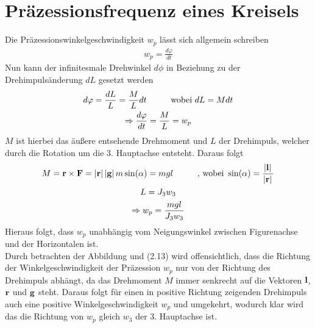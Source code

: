 

\section{Präzessionsfrequenz eines Kreisels}
Die Präzessionswinkelgeschwindigkeit $w_p$ lässt sich allgemein schreiben 
\begin{align}
    w_p = \frac{d\varphi}{dt}
\end{align}
Nun kann der infinitesmale Drehwinkel $d\phi$ in Beziehung zu der Drehimpulsänderung $dL$ gesetzt werden
\begin{gather}
    d\varphi = \frac{dL}{L} = \frac{M}{L} dt \hspace*{1cm}\text{wobei } dL = M dt \\
    \Rightarrow \frac{d\varphi}{dt} = \frac{M}{L} = w_p
\end{gather}
$M$ ist hierbei das äußere entsehende Drehmoment und $L$ der Drehimpuls, welcher durch die Rotation um die 3. Hauptachse entsteht. Daraus folgt
\begin{gather}
    M = \boldsymbol{\mathbf{r}} \times \boldsymbol{\mathbf{F}} = \abs*{\boldsymbol{\mathbf{r}}}\abs*{\boldsymbol{\mathbf{g}}}m\sin(\alpha) = mgl \hspace*{1cm}\text{, wobei }\sin(\alpha)=\frac{\abs*{\boldsymbol{\mathbf{l}}}}{\abs*{\boldsymbol{\mathbf{r}}}}\\
    L = J_3w_3\\
    \Rightarrow w_p = \frac{mgl}{J_3w_3}
\end{gather}
Hieraus folgt, dass $w_p$ unabhängig vom Neigungswinkel zwischen Figurenachse und der Horizontalen ist.\\
Durch betrachten der Abbildung und (2.13) wird offensichtlich, dass die Richtung der Winkelgeschwindigkeit der Präzession $w_p$ nur von der Richtung des Drehimpuls abhängt, da das Drehmoment $M$ immer senkrecht auf die Vektoren $\boldsymbol{\mathbf{l}}$,$\boldsymbol{\mathbf{r}}$ und $\boldsymbol{\mathbf{g}}$ steht. Daraus folgt für einen in positive Richtung zeigenden Drehimpuls auch eine positive Winkelgeschwindigkeit $w_p$ und umgekehrt, wodurch klar wird das die Richtung von $w_p$ gleich $w_3$ der 3. Hauptachse ist.